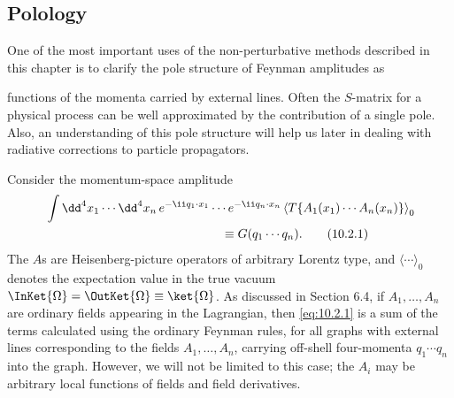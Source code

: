 
\subsection{Polology}

One of the most important uses of the non-perturbative methods described
in this chapter is to clarify the pole structure of Feynman amplitudes as



functions of the momenta carried by external lines. Often the $S$-matrix
for a physical process can be well approximated by the contribution of a
single pole. Also, an understanding of this pole structure will help us later
in dealing with radiative corrections to particle propagators.

Consider the momentum-space amplitude
\begin{align}
  &\int \dd^4x_1\cdots \dd^4x_n\,
  e^{-\ii q_1\cdot x_1}\cdots e^{-\ii q_n\cdot x_n}
  \left\langle T\{A_1(x_1)\cdots A_n(x_n)\}\right\rangle_0
  \notag\\
  &\hspace{5cm}\equiv G(q_1\cdots q_n).
  \tag{10.2.1}\label{eq:10.2.1}
\end{align}
The $A$s are Heisenberg-picture operators of arbitrary Lorentz type, and
$\langle\cdots\rangle_0$ denotes the expectation value in the true vacuum
$\InKet{\Omega}=\OutKet{\Omega}\equiv\ket{\Omega}$.
As discussed in Section 6.4, if $A_1,\ldots,A_n$ are ordinary fields appearing in
the Lagrangian, then \eqref{eq:10.2.1} is a sum of the terms calculated using the
ordinary Feynman rules, for all graphs with external lines corresponding
to the fields $A_1,\ldots,A_n$, carrying off-shell four-momenta $q_1\cdots q_n$ into the
graph. However, we will not be limited to this case; the $A_i$ may be
arbitrary local functions of fields and field derivatives.

